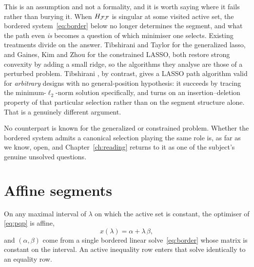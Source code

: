 \begin{remark}
\label{rem:rank}
This is an assumption and not a formality, and it is worth saying where it fails
rather than burying it. When $H_{\mathcal{F}\mathcal{F}}$ is singular at some visited active set,
the bordered system~\eqref{eq:border} below no longer determines the segment, and
what the path even \emph{is} becomes a question of which minimiser one selects.
Existing treatments divide on the answer. Tibshirani and Taylor \cite{tibshirani2011}
for the generalized lasso, and Gaines, Kim and Zhou \cite{gaines2018} for the
constrained LASSO, both restore strong convexity by adding a small ridge, so the
algorithms they analyse are those of a perturbed problem. Tibshirani
\cite{tibshirani2013}, by contrast, gives a LASSO path algorithm valid for
\emph{arbitrary} designs with no general-position hypothesis: it succeeds by tracing
the minimum-$\ell_2$-norm solution specifically, and turns on an
insertion--deletion property of that particular selection rather than on the segment
structure alone. That is a genuinely different argument.

No counterpart is known for the generalized or constrained problem. Whether the
bordered system admits a canonical selection playing the same role is, as far as we
know, open, and Chapter~\ref{ch:reading} returns to it as one of the subject's
genuine unsolved questions.
\end{remark}

\section{Affine segments}

\begin{lemma}
\label{lem:affine}
On any maximal interval of $\lambda$ on which the active set is constant, the
optimiser of \eqref{eq:pqp} is affine,
\begin{equation}
\label{eq:affine}
x(\lambda) = \alpha + \lambda\,\beta ,
\end{equation}
and $(\alpha,\beta)$ come from a single bordered linear solve~\eqref{eq:border}
whose matrix is constant on the interval. An active inequality row enters that solve
identically to an equality row.
\end{lemma}

